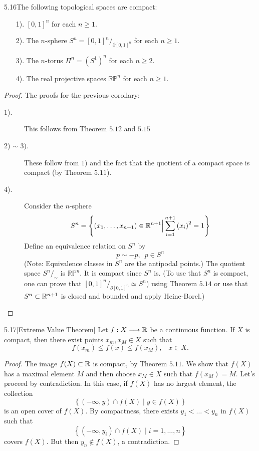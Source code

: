 \begin{customcoro}{5.16}The following topological spaces are compact:
\begin{enumerate}
    \item[1).] $[0,1]^n$ for each $n \geqslant 1$.
    \item[2).] The $n$-sphere $S^n = [0,1]^n / _{\partial [0, 1]^n}$ for each $n \geqslant 1$.
    \item[3).] The $n$-torus $\Pi^n = \left(S^1\right)^n$ for each $n \geqslant 2$.
    \item[4).] The real projective spaces $\mathbb{RP}^n$ for each $n \geqslant 1$.
\end{enumerate}
\end{customcoro}

\begin{proof} The proofs for the previous corollary:
\begin{description}
    \item[1).] This follows from Theorem $5.12$ and $5.15$
    \item[2) $\sim$ 3).] These follow from $1)$ and the fact that the quotient of a compact space is compact (by Theorem $5.11$).
    \item[4).] Consider the $n$-sphere
    $$S^n = \left\{\left(x_1, \dots, x_{n+1} \right) \in \mathbb{R}^{n+1} \Big| \displaystyle\sum_{i = 1}^{n +1} \left(x_i\right)^2 = 1 \right\}$$
    Define an equivalence relation on $S^n$ by 
    $$p \sim -p, \,\,\, p \in S^n$$
    (Note: Equivalence classes in $S^n$ are the antipodal points.) The quotient space $S^n /_{\sim}$ is $\mathbb{RP}^n$. It is compact since $S^n$ is. (To use that $S^n$ is compact, one can prove that $[0,1]^n / _{\partial [0, 1]^n} \simeq S^n$) using Theorem $5.14$ or use that $S^n \subset \mathbb{R}^{n+1}$ is closed and bounded and apply Heine-Borel.)
\end{description}
\end{proof}

\begin{customthm}{5.17}[Extreme Value Theorem] Let $f: X \longrightarrow \mathbb{R}$ be a continuous function. If $X$ is compact, then there exist points $x_m, x_M \in X$ such that 
$$f\left(x_m\right) \leqslant f(x) \leqslant f\left(x_M\right) , \,\,\,\,\, x \in X.$$
\end{customthm}

\begin{proof}
The image $f(X) \subset \mathbb{R}$ is compact, by Theorem $5.11$. We show that $f(X)$ has a maximal element $M$ and then choose $x_M \in X$ such that $f\left(x_M\right) = M$. Let's proceed by contradiction. In this case, if $f(X)$ has no largest element, the collection 
    $$\left\{(-\infty, y) \cap f(X) \mid y \in f(X)\right\}$$
is an open cover of $f(X)$. By compactness, there exists $y_1 < \dots < y_n$ in $f(X)$ such that 
    $$\left\{(-\infty, y_i) \cap f(X) \mid i = 1, \dots, n\right\}$$
covers $f(X)$. But then $y_{n} \notin f(X)$, a contradiction.
\end{proof}

